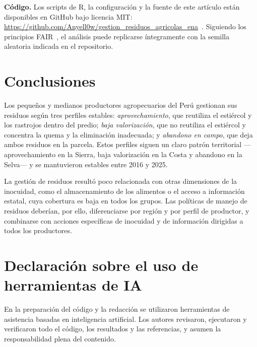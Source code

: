 \documentclass[10pt,twocolumn,a4paper]{article}
\newcommand{\GITHUB}{https://github.com/Anyell0w/gestion_residuos_agricolas_ena}
\begin{document}
\noindent\textbf{Código.} Los scripts de R, la configuración y la fuente de este artículo están disponibles en GitHub bajo licencia MIT: \url{\GITHUB}~\cite{zenodo_code}. Siguiendo los principios FAIR~\cite{wilkinson2016,peng2011}, el análisis puede replicarse íntegramente con la semilla aleatoria indicada en el repositorio.

\section{Conclusiones}
Los pequeños y medianos productores agropecuarios del Perú gestionan sus residuos según tres perfiles estables: \textit{aprovechamiento}, que reutiliza el estiércol y los rastrojos dentro del predio; \textit{baja valorización}, que no reutiliza el estiércol y concentra la quema y la eliminación inadecuada; y \textit{abandono en campo}, que deja ambos residuos en la parcela. Estos perfiles siguen un claro patrón territorial ---aprovechamiento en la Sierra, baja valorización en la Costa y abandono en la Selva--- y se mantuvieron estables entre 2016 y 2025.

La gestión de residuos resultó poco relacionada con otras dimensiones de la inocuidad, como el almacenamiento de los alimentos o el acceso a información estatal, cuya cobertura es baja en todos los grupos. Las políticas de manejo de residuos deberían, por ello, diferenciarse por región y por perfil de productor, y combinarse con acciones específicas de inocuidad y de información dirigidas a todos los productores.

\section*{Declaración sobre el uso de herramientas de IA}
En la preparación del código y la redacción se utilizaron herramientas de asistencia basadas en inteligencia artificial. Los autores revisaron, ejecutaron y verificaron todo el código, los resultados y las referencias, y asumen la responsabilidad plena del contenido.

{\footnotesize


}
\end{document}
